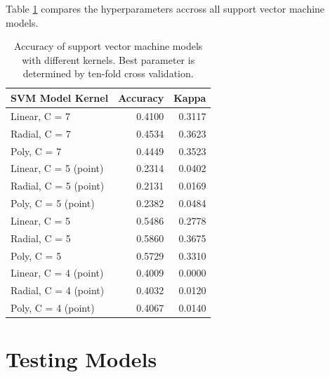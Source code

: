 \documentclass[12pt,twoside]{reedthesis}
\begin{document}
Table \ref{tab:resultsSVM} compares the hyperparameters accross all support vector machine models.
\begin{table}

\caption{\label{tab:resultsSVM}Accuracy of support vector machine models with different kernels. Best parameter is determined by ten-fold cross validation.}
\centering
\begin{tabular}[t]{l|r|r}
\hline
SVM Model Kernel & Accuracy & Kappa\\
\hline
Linear, C = 7 & 0.4100 & 0.3117\\
\hline
Radial, C = 7 & 0.4534 & 0.3623\\
\hline
Poly, C = 7 & 0.4449 & 0.3523\\
\hline
Linear, C = 5 (point) & 0.2314 & 0.0402\\
\hline
Radial, C = 5 (point) & 0.2131 & 0.0169\\
\hline
Poly, C = 5 (point) & 0.2382 & 0.0484\\
\hline
Linear, C = 5 & 0.5486 & 0.2778\\
\hline
Radial, C = 5 & 0.5860 & 0.3675\\
\hline
Poly, C = 5 & 0.5729 & 0.3310\\
\hline
Linear, C = 4 (point) & 0.4009 & 0.0000\\
\hline
Radial, C = 4 (point) & 0.4032 & 0.0120\\
\hline
Poly, C = 4 (point) & 0.4067 & 0.0140\\
\hline
\end{tabular}
\end{table}
\hypertarget{testing-models}{%
\section{Testing Models}\label{testing-models}}
\end{document}
